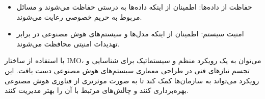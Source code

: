 \documentclass[a4paper,10pt]{article}
\begin{document}
\begin{itemize}
\begin{itemize}
\begin{itemize}
                            \item حفاظت از داده‌ها: اطمینان از اینکه داده‌ها به درستی حفاظت می‌شوند و مسائل مربوط به حریم خصوصی رعایت می‌شوند.

                            \item امنیت سیستم: اطمینان از اینکه مدل‌ها و سیستم‌های هوش مصنوعی در برابر تهدیدات امنیتی محافظت می‌شوند.

                        \end{itemize}

                    \end{itemize}

                \end{itemize}

                با استفاده از ساختار IMO، می‌توان به یک رویکرد منظم و سیستماتیک برای شناسایی و تجسم نیازهای فنی در طراحی معماری سیستم‌های هوش مصنوعی دست یافت. این رویکرد می‌تواند به سازمان‌ها کمک کند تا به صورت موثرتری از فناوری هوش مصنوعی بهره‌برداری کنند و چالش‌های مرتبط با آن را بهتر مدیریت کنند.
\end{document}
